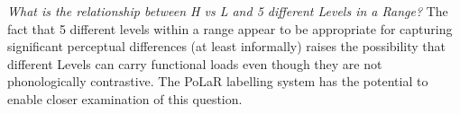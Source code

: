 \textit{What is the relationship between H vs L and 5 different Levels in a Range?}  The fact that 5 different levels within a range appear to be appropriate for capturing significant perceptual differences (at least informally) raises the possibility that different Levels can carry functional loads even though they are not phonologically contrastive.  The PoLaR labelling system has the potential to enable closer examination of this question.
%
%
%
%
